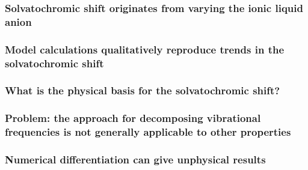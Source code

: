 \documentclass[%
    draft,%
    xcolor=usenames,dvipsnames,svgnames%
]{beamer}
\begin{document}
\begin{frame}
  \frametitle{Solvatochromic shift originates from varying the ionic liquid anion}
\end{frame}

\begin{frame}
  \frametitle{Model calculations qualitatively reproduce trends in the solvatochromic shift}
\end{frame}

\begin{frame}
  \frametitle{What is the physical basis for the solvatochromic shift?}
\end{frame}

\begin{frame}[fragile]
  \frametitle{}
\end{frame}

\begin{frame}
  \frametitle{Problem: the approach for decomposing vibrational frequencies is not generally applicable to other properties}
\end{frame}

\begin{frame}
  \frametitle{Numerical differentiation can give unphysical results}
\end{frame}
\end{document}
